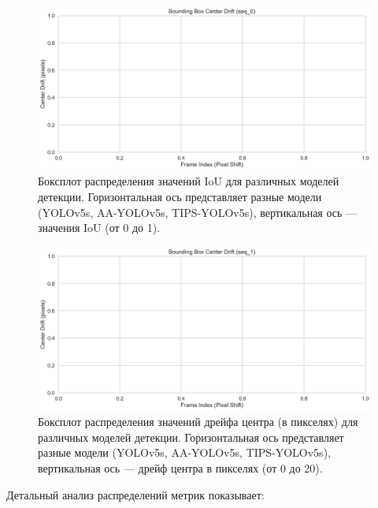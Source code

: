 \begin{figure}[ht]
\centering
\includegraphics[width=\textwidth]{images/detection/center_drift_comparison_seq_0.png}
\caption{Боксплот распределения значений IoU для различных моделей детекции. Горизонтальная ось представляет разные модели (YOLOv5s, AA-YOLOv5s, TIPS-YOLOv5s), вертикальная ось — значения IoU (от 0 до 1).}
\label{fig:boxplot_iou}
\end{figure}

\begin{figure}[ht]
\centering
\includegraphics[width=\textwidth]{images/detection/center_drift_comparison_seq_1.png}
\caption{Боксплот распределения значений дрейфа центра (в пикселях) для различных моделей детекции. Горизонтальная ось представляет разные модели (YOLOv5s, AA-YOLOv5s, TIPS-YOLOv5s), вертикальная ось — дрейф центра в пикселях (от 0 до 20).}
\label{fig:boxplot_center_shift}
\end{figure}

Детальный анализ распределений метрик показывает:

